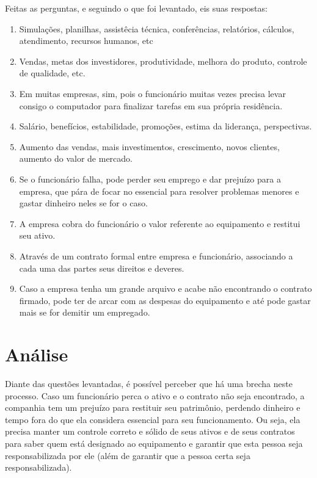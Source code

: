 \documentclass[
	12pt,				%
	openright,			%
	twoside,			%
	a4paper,			%
	english,			%
	french,				%
	spanish,			%
	brazil				%
	]{abntex2}
\begin{document}
Feitas as perguntas, e seguindo o que foi levantado, eis suas respostas:

\begin{enumerate}
    \item Simulações, planilhas, assistêcia técnica, conferências, relatórios, cálculos, atendimento, recursos humanos, etc
    \item Vendas, metas dos investidores, produtividade, melhora do produto, controle de qualidade, etc.
    \item Em muitas empresas, sim, pois o funcionário muitas vezes precisa levar consigo o computador para finalizar tarefas em sua própria residência.
    \item Salário, benefícios, estabilidade, promoções, estima da liderança, perspectivas.
    \item Aumento das vendas, mais investimentos, crescimento, novos clientes, aumento do valor de mercado.
    \item Se o funcionário falha, pode perder seu emprego e dar prejuízo para a empresa, que pára de focar no essencial para resolver problemas menores e gastar dinheiro neles se for o caso.
    \item A empresa cobra do funcionário o valor referente ao equipamento e restitui seu ativo.
    \item Através de um contrato formal entre empresa e funcionário, associando a cada uma das partes seus direitos e deveres.
    \item Caso a empresa tenha um grande arquivo e acabe não encontrando o contrato firmado, pode ter de arcar com as despesas do equipamento e até pode gastar mais se for demitir um empregado.
\end{enumerate}

\section{Análise}

Diante das questões levantadas, é possível perceber que há uma brecha neste processo. Caso um funcionário perca o ativo e o contrato não seja encontrado, a companhia tem um prejuízo para restituir seu patrimônio, perdendo dinheiro e tempo fora do que ela considera essencial para seu funcionamento. Ou seja, ela precisa manter um controle correto e sólido de seus ativos e de seus contratos para saber quem está designado ao equipamento e garantir que esta pessoa seja responsabilizada por ele (além de garantir que a pessoa certa seja responsabilizada).
\end{document}
